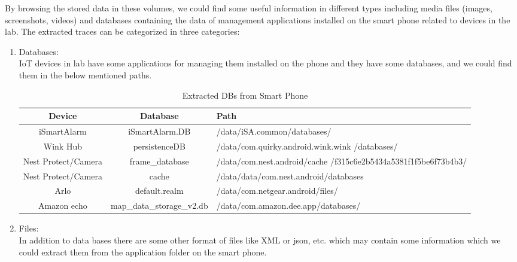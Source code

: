 \documentclass{easychair}
\begin{document}
By browsing the stored data in these volumes, we could find some useful information in different types including media files (images, screenshots, videos) and databases containing the data of management applications installed on the smart phone related to devices in the lab. 
The extracted traces can be categorized in three categories:
\begin{enumerate}
\item Databases:\\
IoT devices in lab have some applications for managing them installed on the phone and they have some databases, and we could find them in the below mentioned paths.\\
\begin{table}[h]

   
\begin{tabular}{|c|c|m{6cm}|}

\hline
Device & Database & Path  \\
\hline
 iSmartAlarm & iSmartAlarm.DB & /data/iSA.common/databases/\\
\hline                    
 Wink Hub & persistenceDB & /data/com.quirky.android.wink.wink /databases/\\
\hline
Nest Protect/Camera & frame\_database & /data/com.nest.android/cache /f315c6e2b5434a5381f1f5be6f73b4b3/ \\
\hline 
Nest Protect/Camera & cache & /data/data/com.nest.android/databases\\
\hline
 Arlo & default.realm & /data/com.netgear.android/files/\\
\hline
Amazon echo & map\_data\_storage\_v2.db	& 	/data/com.amazon.dee.app/databases/\\
\hline 
\end{tabular}
 \caption{Extracted DBs from Smart Phone}
    \label{tab:DB}
\end{table}

\item Files:\\
In addition to data bases there are some other format of files like XML or json, etc. which may contain some information which we could extract them from the application folder on the smart phone.\\


   
\begin{table}[h]
   

\end{table}
\end{enumerate}
\end{document}
